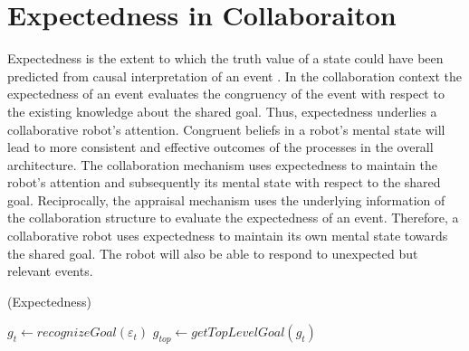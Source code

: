 \documentclass{aamas2016_extendedabstract}
\begin{document}

\section{Expectedness in Collaboraiton}

Expectedness is the extent to which the truth value of a state could have been
predicted from causal interpretation of an event
\cite{marsella:ema-process-model}. In the collaboration context the expectedness
of an event evaluates the congruency of the event with respect to the existing
knowledge about the shared goal. Thus, expectedness underlies a collaborative
robot's attention. Congruent beliefs in a robot's mental state will lead to more
consistent and effective outcomes of the processes in the overall architecture.
The collaboration mechanism uses expectedness to maintain the robot's attention
and subsequently its mental state with respect to the shared goal. Reciprocally,
the appraisal mechanism uses the underlying information of the collaboration
structure to evaluate the expectedness of an event. Therefore, a collaborative
robot uses expectedness to maintain its own mental state towards the shared
goal. The robot will also be able to respond to unexpected but relevant events.

\begin{algorithm}
	\caption{(Expectedness)}
	\label{alg:expectedness}
	\begin{algorithmic}[1]
			\Statex
			\State $\mathit{g}_{t} \gets \textit{recognizeGoal}{(\varepsilon_t)}$
			\State $\mathit{g}_{top} \gets \textit{getTopLevelGoal}{(\mathit{g}_{t})}$
			\Statex
				\State {}
				\Else
					\State {}
				\EndIf
			\Else
					\State {}
				\Else
					\State {}
				\EndIf
			\EndIf
		\EndFunction
	\end{algorithmic}
\end{algorithm}
\end{document}
